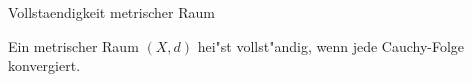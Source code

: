 \documentclass[class=article, crop=false]{standalone}
\begin{document}
\begin{zettel}{Vollstaendigkeit metrischer Raum}
\begin{flashcard}
    \begin{definition}
    Ein metrischer Raum $(X,d)$ hei"st vollst"andig, wenn jede Cauchy-Folge konvergiert.
    \end{definition}

\end{flashcard}
\end{zettel}
\end{document}
